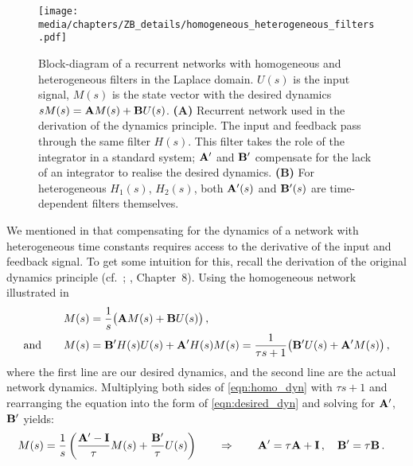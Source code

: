 \begin{figure}
	\texttt{[image: media/chapters/ZB\_details/homogeneous\_heterogeneous\_filters.pdf]}%
	{\label{fig:homogeneous_heterogeneous_filters_a}}%
	{\label{fig:homogeneous_heterogeneous_filters_b}}%
	\caption[Block-diagram of a recurrent networks with homogeneous and heterogeneous filters]{Block-diagram of a recurrent networks with homogeneous and heterogeneous filters in the Laplace domain. $U(s)$ is the input signal, $M(s)$ is the state vector with the desired \LTI dynamics $s M(s) = \mathbf{A} M(s) + \mathbf{B} U(s)$.
	\textbf{(A)} Recurrent network used in the derivation of the \NEF dynamics principle. The input and feedback pass through the same filter $H(s)$.
	This filter takes the role of the integrator in a standard \LTI system; $\mathbf{A}'$ and $\mathbf{B}'$ compensate for the lack of an integrator to realise the desired dynamics.
	\textbf{(B)} For heterogeneous $H_1(s)$, $H_2(s)$, both $\mathbf{A}'(s)$ and $\mathbf{B}'(s)$ are time-dependent filters themselves.
	}
	\label{fig:homogeneous_heterogeneous_filters}
\end{figure}

We mentioned in  that compensating for the dynamics of a network with heterogeneous time constants requires access to the derivative of the input and feedback signal.
To get some intuition for this, recall the derivation of the original \NEF dynamics principle (cf.~; \cite{eliasmith2003neural}, Chapter~8).
Using the homogeneous network illustrated in 
\begin{align}
	M(s) &= \frac{1}{s} \bigl( \mathbf{A} M(s) + \mathbf{B} U(s) \bigr) \,, \label{eqn:desired_dyn}\\
	\text{and} \quad\quad M(s) &= \mathbf{B}' H(s) U(s) + \mathbf{A}' H(s) M(s) = \frac{1}{\tau s + 1} \bigl( \mathbf{B}' U(s) + \mathbf{A}' M(s) \bigr) \label{eqn:homo_dyn}\,,
\end{align}
where the first line are our desired dynamics, and the second line are the actual network dynamics.
Multiplying both sides of \cref{eqn:homo_dyn} with $\tau s + 1$ and rearranging the equation into the form of \cref{eqn:desired_dyn} and solving for $\mathbf{A}'$, $\mathbf{B}'$ yields:
\begin{align*}
	M(s) &= \frac{1}{s} \left( \frac{\mathbf{A}' - \mathbf{I}}{\tau} M(s) +  \frac{\mathbf{B}'}{\tau}  U(s) \right) \quad\quad \Rightarrow \quad\quad \mathbf{A}' = \tau \mathbf{A} + \mathbf{I} \,, \quad \mathbf{B}' = \tau \mathbf{B} \,.
\end{align*}

